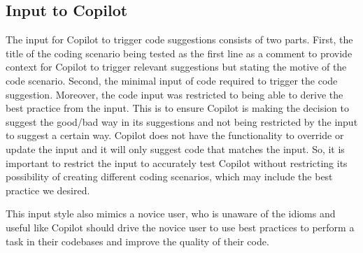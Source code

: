 \subsection{Input to Copilot}
\label{input}
The input for Copilot to trigger code suggestions consists of two parts.
First, the title of the coding scenario being tested as the first line as a comment to provide context for Copilot to trigger relevant suggestions but stating the motive of the code scenario. 
Second, the minimal input of code required to trigger the code suggestion. Moreover, the code input was restricted to being able to derive the best practice from the input. 
This is to ensure Copilot is making the decision to suggest the good/bad way in its suggestions and not being restricted by the input to suggest a certain way. 
Copilot does not have the functionality to override or update the input and it will only suggest code that matches the input. So, it is important to restrict the input to accurately test Copilot without restricting its possibility of creating different coding scenarios, which may include the best practice we desired.

This input style also mimics a novice user, who is unaware of the idioms and useful \cct{} like Copilot should drive the novice user to use best practices to perform a task in their codebases and improve the quality of their code.
